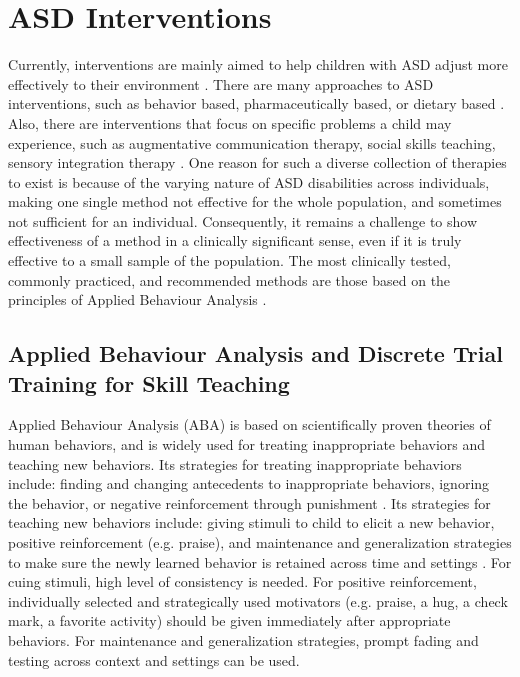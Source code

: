 \section{ASD Interventions}

Currently, interventions are mainly aimed to help children with ASD adjust more effectively to their environment \cite{francis2005autism}.  There are many approaches to ASD interventions, such as behavior based, pharmaceutically based, or dietary based \cite{francis2005autism}.  Also, there are interventions that focus on specific problems a child may experience, such as augmentative communication therapy, social skills teaching, sensory integration therapy \cite{francis2005autism}.  One reason for such a diverse collection of therapies to exist is because of the varying nature of ASD disabilities across individuals, making one single method not effective for the whole population, and sometimes not sufficient for an individual.  Consequently, it remains a challenge to show effectiveness of a method in a clinically significant sense, even if it is truly effective to a small sample of the population.  The most clinically tested, commonly practiced, and recommended methods are those based on the principles of Applied Behaviour Analysis \cite{foxx2008applied}.


\subsection{Applied Behaviour Analysis and Discrete Trial Training for Skill Teaching}
Applied Behaviour Analysis (ABA) is based on scientifically proven theories of human behaviors, and is widely used for treating inappropriate behaviors and teaching new behaviors.  Its strategies for treating inappropriate behaviors include: finding and changing antecedents to inappropriate behaviors, ignoring the behavior, or negative reinforcement through punishment \cite{foxx1982decreasing}.  Its strategies for teaching new behaviors include: giving stimuli to child to elicit a new behavior, positive reinforcement (e.g. praise), and maintenance and generalization strategies to make sure the newly learned behavior is retained across time and settings \cite{foxx1982decreasing}.  For cuing stimuli, high level of consistency is needed.  For positive reinforcement, individually selected and strategically used motivators (e.g. praise, a hug, a check mark, a favorite activity) should be given immediately after appropriate behaviors.  For maintenance and generalization strategies, prompt fading and testing across context and settings can be used.


